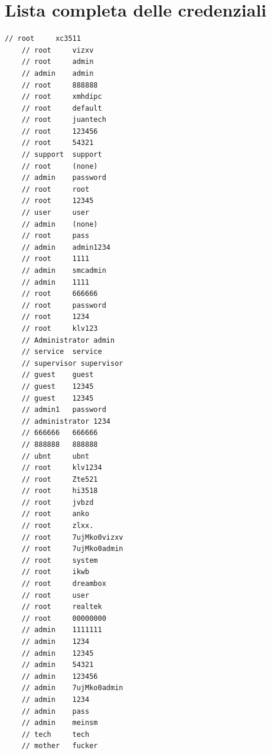 \chapter{Lista completa delle credenziali}
\label{all_credenziali_provate}
\begin{lstlisting}[caption={Tutte le combinazioni di username/password provate.}]
    // root     xc3511
    // root     vizxv
    // root     admin
    // admin    admin
    // root     888888
    // root     xmhdipc
    // root     default
    // root     juantech
    // root     123456
    // root     54321
    // support  support
    // root     (none)
    // admin    password
    // root     root
    // root     12345
    // user     user
    // admin    (none)
    // root     pass
    // admin    admin1234
    // root     1111
    // admin    smcadmin
    // admin    1111
    // root     666666
    // root     password
    // root     1234
    // root     klv123
    // Administrator admin
    // service  service
    // supervisor supervisor
    // guest    guest
    // guest    12345
    // guest    12345
    // admin1   password
    // administrator 1234
    // 666666   666666
    // 888888   888888
    // ubnt     ubnt
    // root     klv1234
    // root     Zte521
    // root     hi3518
    // root     jvbzd
    // root     anko
    // root     zlxx.
    // root     7ujMko0vizxv
    // root     7ujMko0admin
    // root     system
    // root     ikwb
    // root     dreambox
    // root     user
    // root     realtek
    // root     00000000
    // admin    1111111
    // admin    1234
    // admin    12345
    // admin    54321
    // admin    123456
    // admin    7ujMko0admin
    // admin    1234
    // admin    pass
    // admin    meinsm
    // tech     tech
    // mother   fucker

\end{lstlisting}